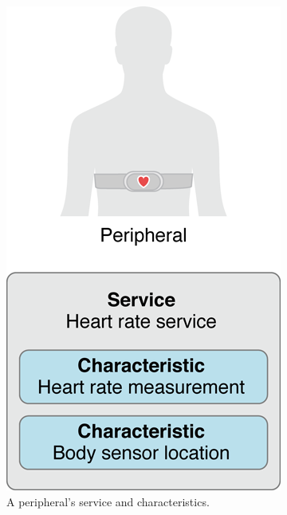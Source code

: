 \documentclass{lab}
\begin{document}
\begin{figure}[h]
    \begin{center}
    \includegraphics[height=0.25\textheight]{images/CBPeripheralData.png} 
    \caption{A peripheral’s service and characteristics.}
    \end{center}
\end{figure}
\end{document}
